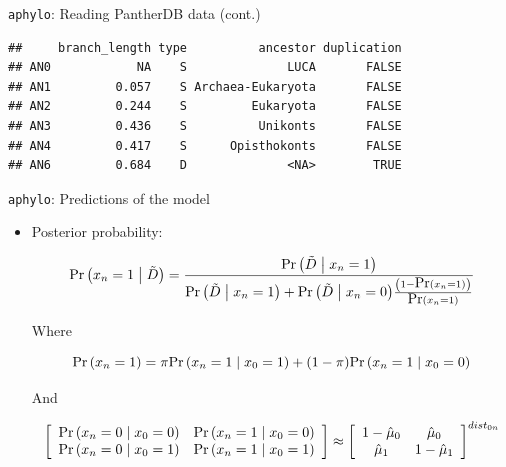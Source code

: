 \documentclass[9pt,ignorenonframetext,aspectratio=169]{beamer}
\newenvironment{Shaded}{\begin{snugshade}}{\end{snugshade}}
\newcommand{\KeywordTok}[1]{\textcolor[rgb]{0.94,0.87,0.69}{#1}}
\newcommand{\CommentTok}[1]{\textcolor[rgb]{0.50,0.62,0.50}{#1}}
\newcommand{\OperatorTok}[1]{\textcolor[rgb]{0.94,0.94,0.82}{#1}}
\newcommand{\NormalTok}[1]{\textcolor[rgb]{0.80,0.80,0.80}{#1}}
\renewcommand{\Pr}[1]{{\mbox{Pr}\left(#1\right) }}
\newcommand{\Prcond}[2]{{\mbox{Pr}\left(#1\vphantom{#2}\;\right|\left.\vphantom{#1}#2\right)}}
\newcommand{\aphylo}{D{}}      %
\newcommand{\aphyloObs}{\tilde \aphylo{}} %
\newcommand{\ann}{x{}} %
\begin{document}
\begin{frame}[fragile]{\texttt{aphylo}: Reading PantherDB data (cont.)}

\footnotesize

\begin{Shaded}
\end{Shaded}

\begin{verbatim}
##     branch_length type          ancestor duplication
## AN0            NA    S              LUCA       FALSE
## AN1         0.057    S Archaea-Eukaryota       FALSE
## AN2         0.244    S         Eukaryota       FALSE
## AN3         0.436    S          Unikonts       FALSE
## AN4         0.417    S      Opisthokonts       FALSE
## AN6         0.684    D              <NA>        TRUE
\end{verbatim}

\normalsize

\footnotesize

\normalsize

\end{frame}

\begin{frame}[t]{\texttt{aphylo}: Predictions of the model}

\begin{itemize}
\item
  Posterior probability:

  \begin{equation}
  \label{eq:impute2}
  \Prcond{\ann_{n} = 1}{\aphyloObs} = 
  \frac{\Prcond{\aphyloObs}{\ann_{n} = 1}}{
  \Prcond{\aphyloObs}{\ann_{n} = 1} + \Prcond{\aphyloObs}{\ann_{n} = 0} \frac{\left(1 - \Pr{\ann_{n} = 1}\right)}{\Pr{\ann_{n} = 1}}
  }
  \end{equation}

  \pause

  Where

  \[
  \Pr{\ann_{n} = 1} = %
  \pi \Prcond{\ann_{n} = 1}{\ann_{0} = 1} + 
  (1 - \pi) \Prcond{\ann_{n} = 1}{\ann_{0} = 0}
  \]

  \pause And

  \[
  \left[\begin{array}{cc}
  \Prcond{\ann_n = 0}{\ann_0 = 0} & \Prcond{\ann_n = 1}{\ann_0 = 0} \\
  \Prcond{\ann_n = 0}{\ann_0 = 1} & \Prcond{\ann_n = 1}{\ann_0 = 1}
  \end{array}
  \right] \approx
  \left[\begin{array}{cc}
  1 - \hat\mu_0 &  \hat\mu_0 \\
  \hat\mu_1 &  1 - \hat\mu_1
  \end{array}
  \right]^{dist_{0n}}
  \]
\end{itemize}

\end{frame}
\end{document}
